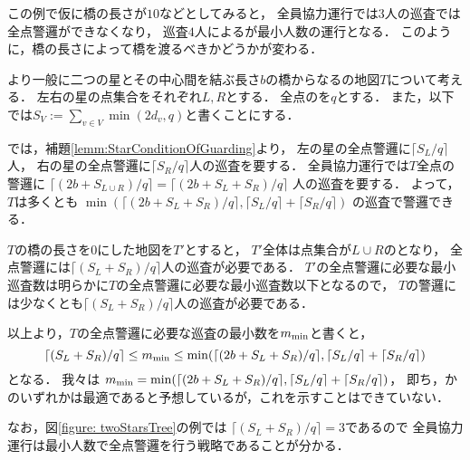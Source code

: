 この例で仮に橋の長さが$10$などとしてみると，
全員協力運行では$3$人の巡査では全点警邏ができなくなり，
巡査$4$人による{\separatedPatroll}が最小人数の運行となる．
このように，橋の長さによって橋を渡るべきかどうかが変わる．

より一般に二つの星とその中心間を結ぶ長さ$b$の橋からなる{\graphTree}の地図$T$について考える．
左右の星の点集合をそれぞれ$L, R$とする．
全点の{\maxIdletime}を$q$とする．
また，以下では$S_V := \sum_{v \in V} \min(2d_v, q)$と書くことにする．
\newcommand{\lrceil}[1]{\lceil{#1}\rceil}

{\separatedPatroll}では，補題\ref{lemm:StarConditionOfGuarding}より，
左の星の全点警邏に$\lrceil{S_L / q}$人，
右の星の全点警邏に$\lrceil{S_R / q}$人の巡査を要する．
全員協力運行では$T$全点の警邏に
$\lrceil{( 2b + S_{L \cup R} ) / q}
 = \lrceil{( 2b + S_L + S_R ) / q}$%
人の巡査を要する．
よって，$T$は多くとも
$\min(
  \lrceil{( 2b + S_L + S_R ) / q},
  \lrceil{S_L / q} + \lrceil{S_R / q} )$%
の巡査で警邏できる．

$T$の橋の長さを$0$にした地図を$T'$とすると，
$T'$全体は点集合が$L \cup R$の{\graphStar}となり，
全点警邏には$\lrceil{(S_L + S_R) / q}$人の巡査が必要である．
$T'$の全点警邏に必要な最小巡査数は明らかに$T$の全点警邏に必要な最小巡査数以下となるので，
$T$の警邏には少なくとも$\lrceil{(S_L + S_R) / q}$人の巡査が必要である．

以上より，$T$の全点警邏に必要な巡査の最小数を$m_{\rm min}$と書くと，
\[
  \lrceil{(S_L + S_R) / q}
    \leq m_{\rm min}
    \leq \min(
        \lrceil{( 2b + S_L + S_R ) / q},
        \lrceil{S_L / q} + \lrceil{S_R / q} )
\]
となる．
我々は
$m_{\rm min} = \min(
        \lrceil{( 2b + S_L + S_R ) / q},
        \lrceil{S_L / q} + \lrceil{S_R / q} )$，
即ち，{\separatedPatroll}か{\cooperativePatroll}のいずれかは最適であると予想しているが，これを示すことはできていない．

なお，図\ref{figure: twoStarsTree}の例では
$\lrceil{(S_L + S_R) / q} = 3$であるので
全員協力運行は最小人数で全点警邏を行う戦略であることが分かる．

